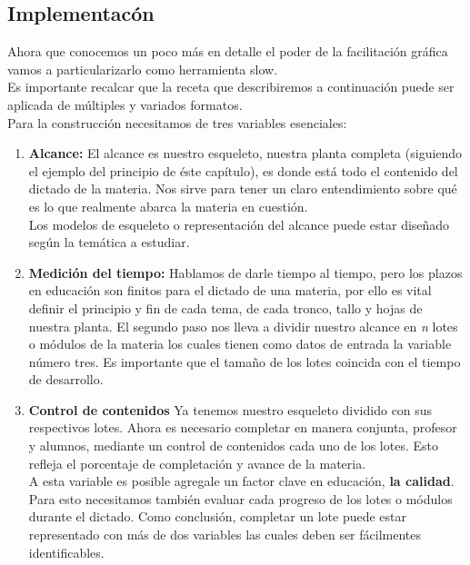 \subsection{Implementac\'on}
Ahora que conocemos un poco m\'as en detalle el poder de la facilitaci\'on gr\'afica vamos a particularizarlo como herramienta slow.\\
Es importante recalcar que la receta que describiremos a continuaci\'on puede ser aplicada de m\'ultiples y variados formatos.\\
Para la construcci\'on necesitamos de tres variables esenciales:
\begin{enumerate}
 \item \textbf{Alcance:}
 El alcance es nuestro esqueleto, nuestra planta completa (siguiendo el ejemplo del principio de \'este cap\'itulo), es donde est\'a todo el contenido del 
 dictado de la materia. Nos sirve para tener un claro entendimiento sobre qu\'e es lo que realmente abarca la materia en cuesti\'on.\\
 Los modelos de esqueleto o representaci\'on del alcance puede estar dise\~nado seg\'un la tem\'atica a estudiar.
 \item \textbf{Medici\'on del tiempo:}
 Hablamos de darle tiempo al tiempo, pero los plazos en educaci\'on son finitos para el dictado de una materia, por ello es vital definir el principio y fin de 
 cada tema, de cada tronco, tallo y hojas de nuestra planta. El segundo paso nos lleva a dividir nuestro alcance en \textit{n} lotes o m\'odulos de la materia
 los cuales tienen como datos de entrada la variable n\'umero tres. Es importante que el tama\~no de los lotes coincida con el tiempo de desarrollo.
 \item \textbf{Control de contenidos}
 Ya tenemos nuestro esqueleto dividido con sus respectivos lotes. Ahora es necesario completar en manera conjunta, profesor y alumnos, mediante un control de 
 contenidos cada uno de los lotes. Esto refleja el porcentaje de completaci\'on y avance de la materia.\\
 A esta variable es posible agregale un factor clave en educaci\'on, \textbf{la calidad}. Para esto necesitamos tambi\'en evaluar cada progreso de los lotes o
 m\'odulos durante el dictado. Como conclusi\'on, completar un lote puede estar representado con m\'as de dos variables las cuales deben ser f\'acilmentes 
 identificables.
\end{enumerate}



